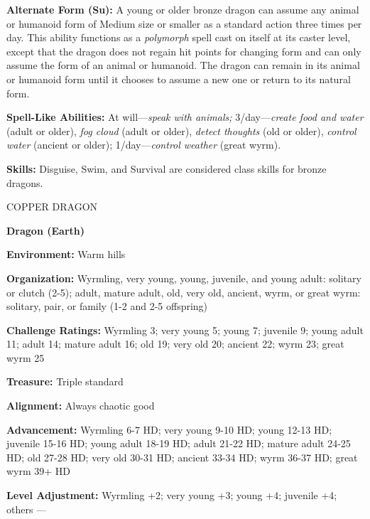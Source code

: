 \documentclass{article}
\begin{document}
{\textbf{Alternate Form (Su): }A young or older bronze dragon can assume any animal 
or humanoid form of Medium size or smaller as a standard action three times per 
day. This ability functions as a \textit{polymorph }spell cast on itself at its 
caster level, except that the dragon does not regain hit points for changing form 
and can only assume the form of an animal or humanoid. The dragon can remain in 
its animal or humanoid form until it chooses to assume a new one or return to its 
natural form.

\textbf{Spell-Like Abilities:} At will---\textit{speak with animals; }3/day---\textit{create 
food and water }(adult or older), \textit{fog cloud }(adult or older), \textit{detect 
thoughts }(old or older), \textit{control water }(ancient or older); 1/day---\textit{control 
weather }(great wyrm).

\textbf{Skills:} Disguise, Swim, and Survival are considered class skills for bronze 
dragons.

\vspace{12pt}
COPPER DRAGON

\textbf{Dragon (Earth)}

\textbf{Environment: }Warm hills

\textbf{Organization:} Wyrmling, very young, young, juvenile, and young adult: 
solitary or clutch (2-5); adult, mature adult, old, very old, ancient, wyrm, or 
great wyrm: solitary, pair, or family (1-2 and 2-5 offspring)

\textbf{Challenge Ratings: }Wyrmling 3; very young 5; young 7; juvenile 9; young 
adult 11; adult 14; mature adult 16; old 19; very old 20; ancient 22; wyrm 23; 
great wyrm 25

\textbf{Treasure: }Triple standard

\textbf{Alignment:} Always chaotic good

\textbf{Advancement:} Wyrmling 6-7 HD; very young 9-10 HD; young 12-13 HD; juvenile 
15-16 HD; young adult 18-19 HD; adult 21-22 HD; mature adult 24-25 HD; old 27-28 
HD; very old 30-31 HD; ancient 33-34 HD; wyrm 36-37 HD; great wyrm 39+ HD

\textbf{Level Adjustment:} Wyrmling +2; very young +3; young +4; juvenile +4; others 
---

}
\end{document}
